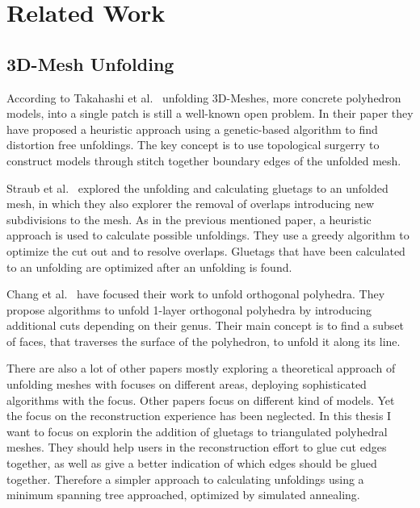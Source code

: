 \documentclass[draft,final]{vutinfth} %
\begin{document}
\chapter{Related Work}
\label{chap:relatedwork}

\section{3D-Mesh Unfolding}
According to Takahashi et al.~\cite{takahashi2011optimized} unfolding 3D-Meshes, more concrete polyhedron models, into a single patch is still a well-known open problem. In their paper they have proposed a heuristic approach using a genetic-based algorithm to find distortion free unfoldings. The key concept is to use topological surgerry to construct models through stitch together boundary edges of the unfolded mesh.

Straub et al.~\cite{straubcreating} explored the unfolding and calculating gluetags to an unfolded mesh, in which they also explorer the removal of overlaps introducing new subdivisions to the mesh. As in the previous mentioned paper, a heuristic approach is used to calculate possible unfoldings. They use a greedy algorithm to optimize the cut out and to resolve overlaps. Gluetags that have been calculated to an unfolding are optimized after an unfolding is found.

Chang et al.~\cite{xi2016learning} have focused their work to unfold orthogonal polyhedra. They propose algorithms to unfold 1-layer orthogonal polyhedra by introducing additional cuts depending on their genus. Their main concept is to find a subset of faces, that traverses the surface of the polyhedron, to unfold it along its line. 

There are also a lot of other papers mostly exploring a theoretical approach of unfolding meshes with focuses on different areas, deploying sophisticated algorithms with the focus. Other papers focus on different kind of models. Yet the focus on the reconstruction experience has been neglected. In this thesis I want to focus on explorin the addition of gluetags to triangulated polyhedral meshes. They should help users in the reconstruction effort to glue cut edges together, as well as give a better indication of which edges should be glued together. Therefore a simpler approach to calculating unfoldings using a minimum spanning tree approached, optimized by simulated annealing.
\end{document}
